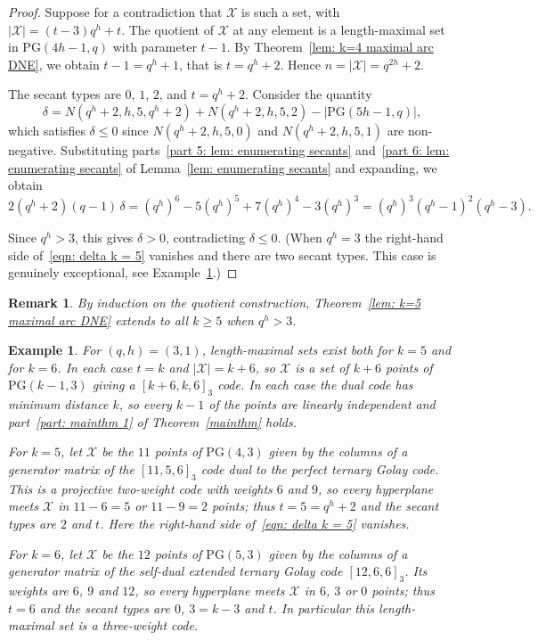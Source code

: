 \documentclass[12pt, twoside]{article}
\newtheorem{example}[theorem]{\bf Example}
\newtheorem{remark}[theorem]{\bf Remark}
\begin{document}
	\begin{proof}
		Suppose for a contradiction that $\mathcal{X}$ is such a set, with $|\mathcal{X}|=(t-3)q^h+t$. The quotient of $\mathcal{X}$ at any element is a length-maximal set in $\mathrm{PG}(4h-1,q)$ with parameter $t-1$. By Theorem~\ref{lem: k=4 maximal arc DNE}, we obtain $t-1=q^h+1$, that is $t=q^h+2$. Hence $n=|\mathcal{X}|=q^{2h}+2$.
		
		The secant types are $0$, $1$, $2$, and $t=q^h+2$. Consider the quantity
		\begin{equation} \label{eqn: difference k = 5}
			\delta = N(q^h+2,h,5,q^h+2) + N(q^h+2,h,5,2) - |\mathrm{PG}(5h-1,q)|,
		\end{equation}
		which satisfies $\delta \le 0$ since $N(q^h+2,h,5,0)$ and $N(q^h+2,h,5,1)$ are non-negative. Substituting parts~\ref{part 5: lem: enumerating secants} and~\ref{part 6: lem: enumerating secants} of Lemma~\ref{lem: enumerating secants} and expanding, we obtain
		\begin{equation}\label{eqn: delta k = 5}
			2(q^h+2)(q-1)\,\delta = (q^h)^6 - 5(q^h)^5 + 7(q^h)^4 - 3(q^h)^3 = (q^h)^3(q^h-1)^2(q^h-3).
		\end{equation}
		
		 Since $q^h > 3$, this gives $\delta > 0$, contradicting $\delta \le 0$. (When $q^h=3$ the right-hand side of~\eqref{eqn: delta k = 5} vanishes and there are two secant types.  This case is genuinely exceptional, see Example~\ref{ex: golay}.)
	\end{proof}

\begin{remark}\label{rem: induction}
	By induction on the quotient construction, Theorem~\ref{lem: k=5 maximal arc DNE} extends to all $k \ge 5$ when $q^h > 3$.
\end{remark}

	\begin{example}\label{ex: golay}
		For $(q,h)=(3,1)$, length-maximal sets exist both for $k=5$ and for $k=6$. In each case $t=k$ and $|\mathcal{X}|=k+6$, so $\mathcal{X}$ is a set of $k+6$ points of $\mathrm{PG}(k-1,3)$ giving a $[k+6,k,6]_3$ code. In each case the dual code has minimum distance $k$, so every $k-1$ of the points are linearly independent and part~\ref{part: mainthm 1} of Theorem~\ref{mainthm} holds.

		For $k=5$, let $\mathcal{X}$ be the $11$ points of $\mathrm{PG}(4,3)$ given by the columns of a generator matrix of the $[11,5,6]_3$ code dual to the perfect ternary Golay code. This is a projective two-weight code with weights $6$ and $9$, so every hyperplane meets $\mathcal{X}$ in $11-6=5$ or $11-9=2$ points; thus $t=5=q^h+2$ and the secant types are $2$ and $t$. Here the right-hand side of~\eqref{eqn: delta k = 5} vanishes.

		For $k=6$, let $\mathcal{X}$ be the $12$ points of $\mathrm{PG}(5,3)$ given by the columns of a generator matrix of the self-dual extended ternary Golay code $[12,6,6]_3$. Its weights are $6$, $9$ and $12$, so every hyperplane meets $\mathcal{X}$ in $6$, $3$ or $0$ points; thus $t=6$ and the secant types are $0$, $3=k-3$ and $t$. In particular this length-maximal set is a three-weight code.
	\end{example}
\end{document}
